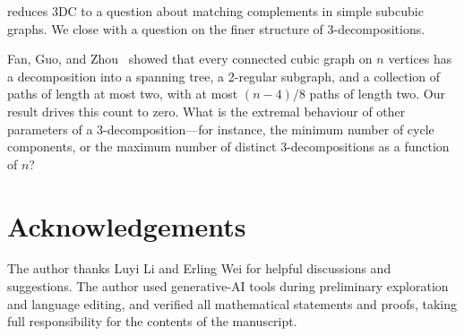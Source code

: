 \documentclass[a4paper,11pt]{article}
\numberwithin{equation}{section}
\begin{document}
 reduces 3DC to a question about matching
complements in simple subcubic graphs. We close with a question on the finer
structure of $3$-decompositions.

\begin{question}
  Fan, Guo, and Zhou~\cite{FanGuoZhou2026} showed that every connected cubic
  graph on $n$ vertices has a decomposition into a spanning tree, a 2-regular
  subgraph, and a collection of paths of length at most two, with at most
  $(n-4)/8$ paths of length two. Our result drives this count to zero. What is
  the extremal behaviour of other parameters of a $3$-decomposition---for
  instance, the minimum number of cycle components, or the maximum number of
  distinct $3$-decompositions as a function of $n$?
\end{question}


\section*{Acknowledgements}

The author thanks Luyi Li and Erling Wei for helpful discussions and
suggestions. The author used generative-AI tools during preliminary exploration
and language editing, and verified all mathematical statements and proofs, taking
full responsibility for the contents of the manuscript.
\end{document}
